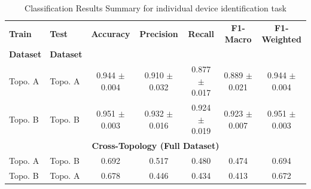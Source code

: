 
\begin{table}[t]
\centering
\footnotesize
\setlength{\tabcolsep}{3pt}
\renewcommand{\arraystretch}{1.1}
\caption{Classification Results Summary for individual device identification task}
\label{tab:classification_results_name}
\begin{tabular}{llccccc}
\toprule
\textbf{Train} & \textbf{Test} & \textbf{Accuracy} & \textbf{Precision} & \textbf{Recall} & \textbf{F1-Macro} & \textbf{F1-Weighted} \\
\textbf{Dataset} & \textbf{Dataset} &  &  &  &  &  \\
Topo. A & Topo. A & 0.944 $\pm$ 0.004 & 0.910 $\pm$ 0.032 & 0.877 $\pm$ 0.017 & 0.889 $\pm$ 0.021 & 0.944 $\pm$ 0.004 \\
Topo. B & Topo. B & 0.951 $\pm$ 0.003 & 0.932 $\pm$ 0.016 & 0.924 $\pm$ 0.019 & 0.923 $\pm$ 0.007 & 0.951 $\pm$ 0.003 \\
\midrule
\multicolumn{7}{c}{\textbf{Cross-Topology (Full Dataset)}} \\
\midrule
Topo. A & Topo. B & 0.692 & 0.517 & 0.480 & 0.474 & 0.694 \\
Topo. B & Topo. A & 0.678 & 0.446 & 0.434 & 0.413 & 0.672 \\
\bottomrule
\end{tabular}
\end{table}




